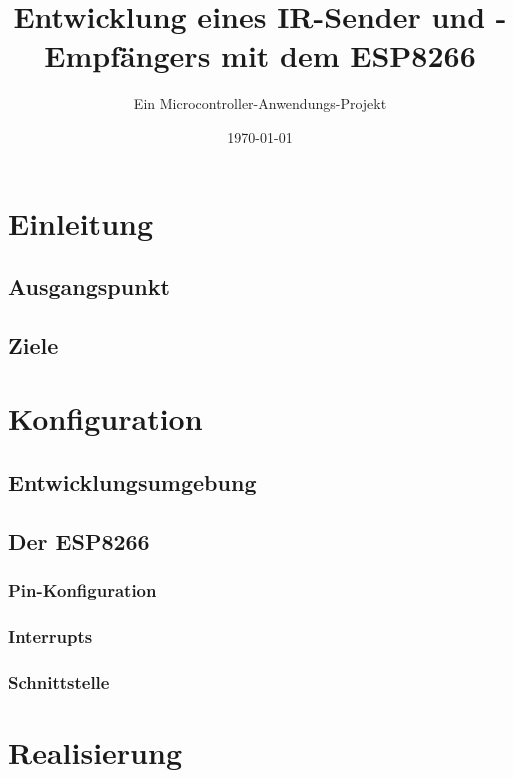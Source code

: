 						




\title{Entwicklung eines IR-Sender und -Empfängers mit dem ESP8266}
\subtitle{Ein Microcontroller-Anwendungs-Projekt}
\author{}
\date{\today}

\maketitle

\tableofcontents										%
\pagebreak
\listoffigures											%
\pagebreak
\listoftables											%
\pagebreak

\section{Einleitung}

\subsection{Ausgangspunkt}
\subsection{Ziele}

\section{Konfiguration}
\subsection{Entwicklungsumgebung}
\subsection{Der ESP8266}
\subsubsection{Pin-Konfiguration}
\subsubsection{Interrupts}
\subsubsection{Schnittstelle}

\section{Realisierung}
